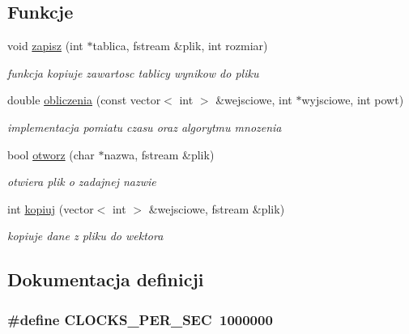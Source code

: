\subsection*{\-Funkcje}
\begin{DoxyCompactItemize}
\item 
void \hyperlink{funkcje_8hh_aaa6c62fc60fb1173b904269379d69754}{zapisz} (int $\ast$tablica, fstream \&plik, int rozmiar)
\begin{DoxyCompactList}\small\item\em funkcja kopiuje zawartosc tablicy wynikow do pliku \end{DoxyCompactList}\item 
double \hyperlink{funkcje_8hh_ad9ebe61e239dee170b242bda4db9ea63}{obliczenia} (const vector$<$ int $>$ \&wejsciowe, int $\ast$wyjsciowe, int powt)
\begin{DoxyCompactList}\small\item\em implementacja pomiatu czasu oraz algorytmu mnozenia \end{DoxyCompactList}\item 
bool \hyperlink{funkcje_8hh_ab80d311fc13e71453f3080482634447e}{otworz} (char $\ast$nazwa, fstream \&plik)
\begin{DoxyCompactList}\small\item\em otwiera plik o zadajnej nazwie \end{DoxyCompactList}\item 
int \hyperlink{funkcje_8hh_a1cddff5e49afc682449b3bda713006f5}{kopiuj} (vector$<$ int $>$ \&wejsciowe, fstream \&plik)
\begin{DoxyCompactList}\small\item\em kopiuje dane z pliku do wektora \end{DoxyCompactList}\end{DoxyCompactItemize}


\subsection{\-Dokumentacja definicji}
\hypertarget{funkcje_8hh_a3d9fc3c745d0880902fe3ea3d5d5f71e}{
\subsubsection[{\-C\-L\-O\-C\-K\-S\-\_\-\-P\-E\-R\-\_\-\-S\-E\-C}]{\setlength{\rightskip}{0pt plus 5cm}\#define {\bf \-C\-L\-O\-C\-K\-S\-\_\-\-P\-E\-R\-\_\-\-S\-E\-C}~1000000}}\label{funkcje_8hh_a3d9fc3c745d0880902fe3ea3d5d5f71e}


